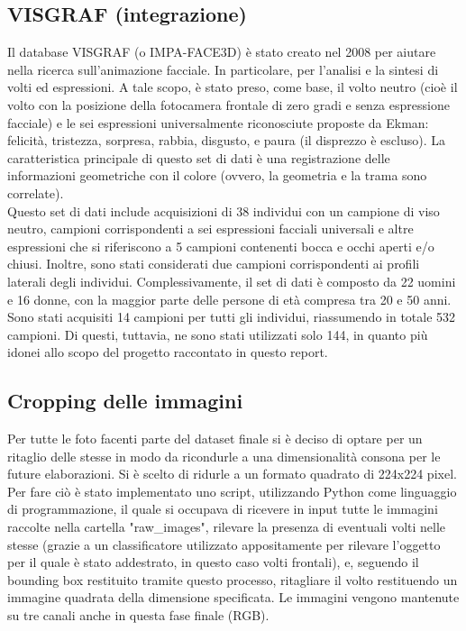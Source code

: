 \subsection{VISGRAF (integrazione)}
Il database VISGRAF (o IMPA-FACE3D) è stato creato nel 2008 per aiutare nella ricerca sull'animazione facciale. In particolare, per l'analisi e la sintesi di volti ed espressioni. A tale scopo, è stato preso, come base, il volto neutro (cioè il volto con la posizione della fotocamera frontale di zero gradi e senza espressione facciale) e le sei espressioni universalmente riconosciute proposte da Ekman: felicità, tristezza, sorpresa, rabbia, disgusto, e paura (il disprezzo è escluso). La caratteristica principale di questo set di dati è una registrazione delle informazioni geometriche con il colore (ovvero, la geometria e la trama sono correlate).\\
Questo set di dati include acquisizioni di 38 individui con un campione di viso neutro, campioni corrispondenti a sei espressioni facciali universali e altre espressioni che si riferiscono a 5 campioni contenenti bocca e occhi aperti e/o chiusi. Inoltre, sono stati considerati due campioni corrispondenti ai profili laterali degli individui. Complessivamente, il set di dati è composto da 22 uomini e 16 donne, con la maggior parte delle persone di età compresa tra 20 e 50 anni. Sono stati acquisiti 14 campioni per tutti gli individui, riassumendo in totale 532 campioni. Di questi, tuttavia, ne sono stati utilizzati solo 144, in quanto più idonei allo scopo del progetto raccontato in questo report.

\subsection{Cropping delle immagini}
Per tutte le foto facenti parte del dataset finale si è deciso di optare per un ritaglio delle stesse in modo da ricondurle a una dimensionalità consona per le future elaborazioni. Si è scelto di ridurle a un formato quadrato di 224x224 pixel.\\
Per fare ciò è stato implementato uno script, utilizzando Python come linguaggio di programmazione, il quale si occupava di ricevere in input tutte le immagini raccolte nella cartella "raw\_images", rilevare la presenza di eventuali volti nelle stesse (grazie a un classificatore utilizzato appositamente per rilevare l'oggetto per il quale è stato addestrato, in questo caso volti frontali), e, seguendo il bounding box restituito tramite questo processo, ritagliare il volto restituendo un immagine quadrata della dimensione specificata.
Le immagini vengono mantenute su tre canali anche in questa fase finale (RGB).

